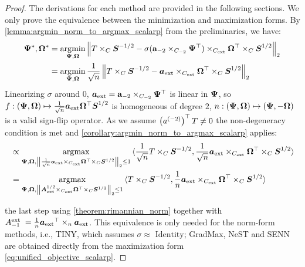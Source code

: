 \begin{proof}

The derivations for each method are provided in the following sections.
We only prove the equivalence between the minimization and maximization
forms. By \autoref{lemma:argmin_norm_to_argmax_scalarp} from the
preliminaries, we have:
\begin{equation}
\begin{aligned}
\Fanin{}^{\ast},\Fanout{}^{\ast} & = \argmin_{\Fanin{},\Fanout{}}\left\| {T \times_{C}\isqrtS - \sigma(\mathbf{a}_{- 2} \times_{C_{- 2}}\Fanin{}^{\top}) \times_{\cext}\Fanout{}^{\top} \times_{C}\sqrtS} \right\|_{2} \\
 & = \argmin_{\Fanin{},\Fanout{}}\frac{1}{\sqrt{n}}\left\| {T \times_{C}\isqrtS - \Postactext \times_{\cext}\Fanout{}^{\top} \times_{C}\sqrtS} \right\|_{2}
\end{aligned}
\end{equation}
Linearizing $\sigma$ around $0$, $\Postactext = \mathbf{a}_{- 2} \times_{C_{- 2}}\Fanin{}^{\top}$ is linear in $\Fanin{}$, so $f:\left( \Fanin{},\Fanout{} \right) \mapsto \frac{1}{\sqrt{n}}\Postactext\Fanout{}^{\top}\sqrtS$ is homogeneous of degree $2$, $n:\left( \Fanin{},\Fanout{} \right) \mapsto \left( \Fanin{}, - \Fanout{} \right)$ is a valid sign-flip operator. As we assume $\transp{\postact[-2]}T \neq 0$ the non-degeneracy condition is met and \autoref{corollary:argmin_norm_to_argmax_scalarp} applies:
\begin{equation}
\begin{aligned}
 & \propto \argmax_{\Fanin{},\Fanout{},\left\| {\frac{1}{\sqrt{n}}\Postactext \times_{\cext}\Fanout{}^{\top} \times_{C}\sqrtS} \right\|_{2} \leq 1}{\langle\frac{1}{\sqrt{n}}T \times_{C}\isqrtS,\frac{1}{\sqrt{n}}\Postactext \times_{\cext}\Fanout{}^{\top} \times_{C}\sqrtS\rangle} \\
 & = \argmax_{\Fanin{},\Fanout{},\left\| {\sqrtAext \times_{\cext}\Fanout{}^{\top} \times_{C}\sqrtS} \right\|_{2} \leq 1}{\langle T \times_{C}\isqrtS,\frac{1}{n}\Postactext \times_{\cext}\Fanout{}^{\top} \times_{C}\sqrtS\rangle}
\end{aligned}
\end{equation}

the last step using \autoref{theorem:rimannian_norm} together with
\(A_{- 1}^{\text{ext }} = \frac{1}{n}\Postactext^{\top} \times_{n}\Postactext\).
This equivalence is only needed for the norm-form methods, i.e., TINY,
which assumes \(\sigma \approx \text{ Identity}\); GradMax, NeST and
SENN are obtained directly from the maximization form
\autoref{eq:unified_objective_scalarp}.

\end{proof}

